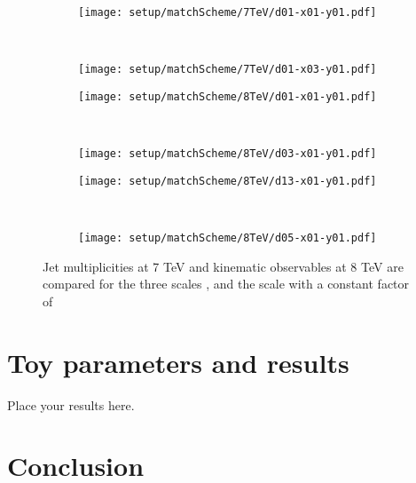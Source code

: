 \documentclass[PUB, UKenglish, texlive=2016]{\ATLASLATEXPATH atlasdoc}
\begin{document}
\begin{figure}
\centering
	\begin{subfigure}[b]{0.4\textwidth}
	\texttt{[image: setup/matchScheme/7TeV/d01-x01-y01.pdf]}
	\end{subfigure} 
	~
	\begin{subfigure}[b]{0.4\textwidth}
	\texttt{[image: setup/matchScheme/7TeV/d01-x03-y01.pdf]}
	\end{subfigure}
	
	\begin{subfigure}[b]{0.4\textwidth}
	\texttt{[image: setup/matchScheme/8TeV/d01-x01-y01.pdf]}
	\end{subfigure}
	~
	\begin{subfigure}[b]{0.4\textwidth}
	\texttt{[image: setup/matchScheme/8TeV/d03-x01-y01.pdf]}
	\end{subfigure}
	
	\begin{subfigure}[b]{0.4\textwidth}
	\texttt{[image: setup/matchScheme/8TeV/d13-x01-y01.pdf]}
	\end{subfigure}
	~
	\begin{subfigure}[b]{0.4\textwidth}
	\texttt{[image: setup/matchScheme/8TeV/d05-x01-y01.pdf]}
	\end{subfigure}
	\caption{Jet multiplicities at 7 TeV and kinematic observables at 8 TeV are compared for the three scales \TopPairMassScale, \TopMTScale and the \ETScale scale with a constant factor of }
	\label{setup:matchdeps}
\end{figure}


\section{Toy parameters and results}
\label{sec:result}

Place your results here.



\section{Conclusion}
\label{sec:conclusion}
\end{document}
